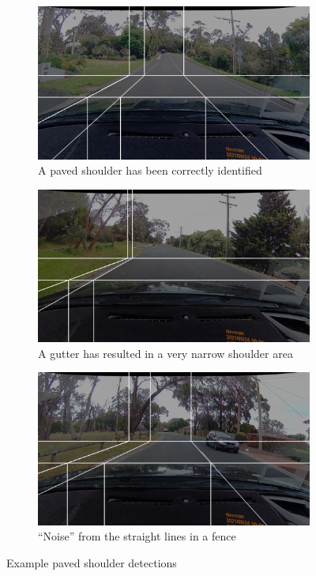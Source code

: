 \documentclass[11pt,twoside]{report}
\begin{document}
\begin{figure}[h]
\centering
\begin{subfigure}{0.3\textwidth}
	\includegraphics[width=\textwidth]{f011_true.png}
	\caption{A paved shoulder has been correctly identified}
	\label{fig:011a}
\end{subfigure}
\hfill
\begin{subfigure}{0.3\textwidth}
	\includegraphics[width=\textwidth]{f011_false_gutter.png}
	\caption{A gutter has resulted in a very narrow shoulder area}
	\label{fig:011b}
\end{subfigure}
\hfill
\begin{subfigure}{0.3\textwidth}
	\includegraphics[width=\textwidth]{f011_false_fence.png}
	\caption{``Noise'' from the straight lines in a fence}
	\label{fig:011c}
\end{subfigure}
\caption{Example paved shoulder detections}
\label{fig:011}
\end{figure}
\end{document}
